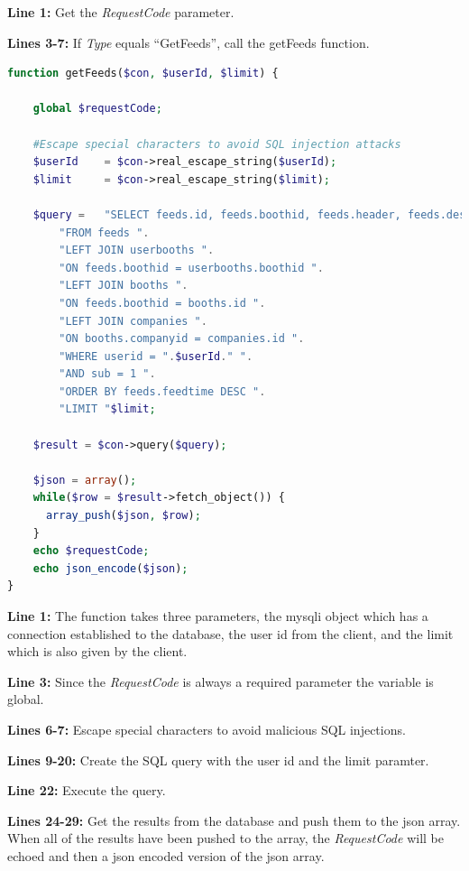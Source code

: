\begin{description}
\item \textbf{Line 1: }Get the \textit{RequestCode} parameter.
\item \textbf{Lines 3-7: }If \textit{Type} equals ``GetFeeds'', call the getFeeds function.
\end{description}


\begin{lstlisting}[language=php, caption=getFeeds function]
function getFeeds($con, $userId, $limit) {

    global $requestCode;

    #Escape special characters to avoid SQL injection attacks
    $userId    = $con->real_escape_string($userId);
    $limit     = $con->real_escape_string($limit);

    $query =   "SELECT feeds.id, feeds.boothid, feeds.header, feeds.description, feeds.feedtime, userbooths.userid, companies.logo, booths.name ".
        "FROM feeds ".
        "LEFT JOIN userbooths ".
        "ON feeds.boothid = userbooths.boothid ".
        "LEFT JOIN booths ".
        "ON feeds.boothid = booths.id ".
        "LEFT JOIN companies ".
        "ON booths.companyid = companies.id ".
        "WHERE userid = ".$userId." ".
        "AND sub = 1 ".
        "ORDER BY feeds.feedtime DESC ".
        "LIMIT "$limit;

    $result = $con->query($query);

    $json = array();
    while($row = $result->fetch_object()) {
      array_push($json, $row);
    }
    echo $requestCode;
    echo json_encode($json);
}
\end{lstlisting}

\begin{description}
\item \textbf{Line 1: }The function takes three parameters, the mysqli object which has a connection
  established to the database, the user id from the client, and the limit which is also given by the client.
\item \textbf{Line 3: }Since the \textit{RequestCode} is always a required parameter the variable is global.
\item \textbf{Lines 6-7: }Escape special characters to avoid malicious SQL injections.
\item \textbf{Lines 9-20: }Create the SQL query with the user id and the limit paramter.
\item \textbf{Line 22: }Execute the query.
\item \textbf{Lines 24-29: }Get the results from the database and push them to the json array. When
  all of the results have been pushed to the array, the \textit{RequestCode} will be echoed and then
  a json encoded version of the json array.
\end{description}

